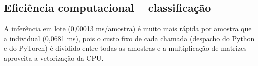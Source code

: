 \documentclass[11pt,a4paper]{article}
\begin{document}
\subsection{Eficiência computacional -- classificação}
\begin{table}[H]\centering\scriptsize{}
\caption{Eficiência (classificação). Energia estimada como potência assumida (15 W) $\times$ tempo; CO$_2$ = kWh $\times$ 45,8 g/kWh (fator do Brasil, Aula 08).}\label{tab:ef_clf}\end{table}
A inferência em lote (0,00013 ms/amostra) é muito mais rápida por amostra que a individual (0,0681 ms), pois o custo fixo de cada chamada (despacho do Python e do PyTorch) é dividido entre todas as amostras e a multiplicação de matrizes aproveita a vetorização da CPU.
\end{document}
